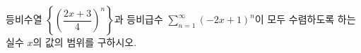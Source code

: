 등비수열 $\left\{\left(\dfrac{2x+3}{4}\right)^n\right\}$과 등비급수 $\displaystyle\sum_{n=1}^{\infty} (-2x+1)^n$이 모두 수렴하도록 하는 실수 $x$의 값의 범위를 구하시오.
